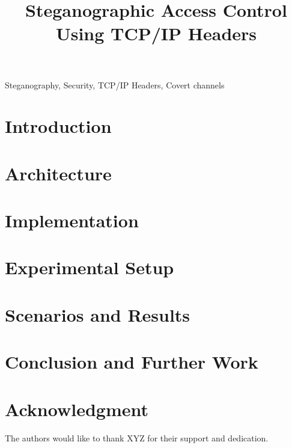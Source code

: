 \documentclass[conference]{IEEEtran}
\begin{document}
\title{Steganographic Access Control Using TCP/IP Headers}

\author{
}

\maketitle

\begin{abstract}

\end{abstract}


\begin{IEEEkeywords}
Steganography, Security, TCP/IP Headers, Covert channels
\end{IEEEkeywords}


\section{Introduction}
\label{sec:introduction}


\section{Architecture}
\label{sec:architecture}


\section{Implementation}
\label{sec:implementation}


\section{Experimental Setup}
\label{sec:setup}


\section{Scenarios and Results}
\label{sec:results}


\section{Conclusion and Further Work}
\label{sec:conclusion}


\section*{Acknowledgment}
\label{sec:acknowledgment}

The authors would like to thank XYZ for their support and dedication.



\end{document}
